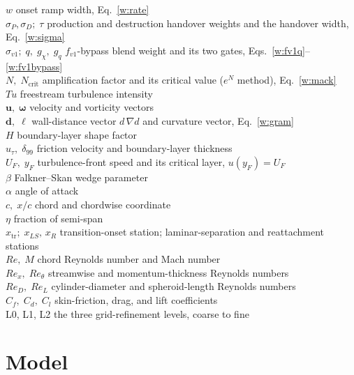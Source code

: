 \documentclass[10pt]{article}
\begin{document}
\begin{tabbing}
  $w$ \> onset ramp width, Eq.~\eqref{w:rate} \\
  $\sigma_P,\sigma_D;\;\tau$ \> production and destruction handover weights and the handover width, Eq.~\eqref{w:sigma} \\
  $\sigma_{v1};\;q,\;g_\chi,\;g_q$ \> $f_{v1}$-bypass blend weight and its two gates, Eqs.~\eqref{w:fv1q}--\eqref{w:fv1bypass} \\
  $N,\;N_\mathrm{crit}$ \> amplification factor and its critical value ($e^N$ method), Eq.~\eqref{w:mack} \\
  $Tu$ \> freestream turbulence intensity \\
  $\mathbf u,\;\boldsymbol\omega$ \> velocity and vorticity vectors \\
  $\mathbf d,\;\boldsymbol\ell$ \> wall-distance vector $d\,\nabla d$ and curvature vector, Eq.~\eqref{w:gram} \\
  $H$ \> boundary-layer shape factor \\
  $u_\tau,\;\delta_{99}$ \> friction velocity and boundary-layer thickness \\
  $U_F,\;y_F$ \> turbulence-front speed and its critical layer, $u(y_F)=U_F$ \\
  $\beta$ \> Falkner--Skan wedge parameter \\
  $\alpha$ \> angle of attack \\
  $c,\;x/c$ \> chord and chordwise coordinate \\
  $\eta$ \> fraction of semi-span \\
  $x_\mathrm{tr};\;x_{LS},\,x_R$ \> transition-onset station; laminar-separation and reattachment stations \\
  $Re,\;M$ \> chord Reynolds number and Mach number \\
  $Re_x,\;Re_\theta$ \> streamwise and momentum-thickness Reynolds numbers \\
  $Re_D,\;Re_L$ \> cylinder-diameter and spheroid-length Reynolds numbers \\
  $C_f,\;C_d,\;C_l$ \> skin-friction, drag, and lift coefficients \\
  L0, L1, L2 \> the three grid-refinement levels, coarse to fine \\
\end{tabbing}

\clearpage

\section{Model}
\end{document}
